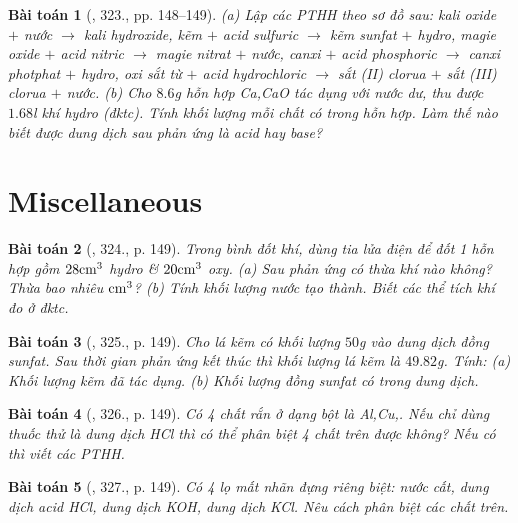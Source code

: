 \documentclass{article}
\newtheorem{baitoan}{Bài toán}
\begin{document}
\begin{baitoan}[\cite{An_400_BT_Hoa_Hoc_8_2020}, 323., pp. 148--149]
	(a) Lập các PTHH theo sơ đồ sau: kali oxide $+$ nước $\to$ kali hydroxide, kẽm $+$ acid sulfuric $\to$ kẽm sunfat $+$ hydro, magie oxide $+$ acid nitric $\to$ magie nitrat $+$ nước, canxi $+$ acid phosphoric $\to$ canxi photphat $+$ hydro, oxi sắt từ \emph{} $+$ acid hydrochloric $\to$ sắt (II) clorua $+$ sắt (III) clorua $+$ nước. (b) Cho $8.6$\emph{g} hỗn hợp \emph{Ca,CaO} tác dụng với nước dư, thu được $1.68$\emph{l} khí hydro (đktc). Tính khối lượng mỗi chất có trong hỗn hợp. Làm thế nào biết được dung dịch sau phản ứng là acid hay base?
\end{baitoan}


\section{Miscellaneous}

\begin{baitoan}[\cite{An_400_BT_Hoa_Hoc_8_2020}, 324., p. 149]
	Trong bình đốt khí, dùng tia lửa điện để đốt 1 hỗn hợp gồm $\rm28cm^3$ hydro \& $\rm20cm^3$ oxy. (a) Sau phản ứng có thừa khí nào không? Thừa bao nhiêu $\rm cm^3$? (b) Tính khối lượng nước tạo thành. Biết các thể tích khí đo ở đktc.
\end{baitoan}

\begin{baitoan}[\cite{An_400_BT_Hoa_Hoc_8_2020}, 325., p. 149]
	Cho lá kẽm có khối lượng $50$\emph{g} vào dung dịch đồng sunfat. Sau thời gian phản ứng kết thúc thì khối lượng lá kẽm là $49.82$\emph{g}. Tính: (a) Khối lượng kẽm đã tác dụng. (b) Khối lượng đồng sunfat có trong dung dịch.
\end{baitoan}

\begin{baitoan}[\cite{An_400_BT_Hoa_Hoc_8_2020}, 326., p. 149]
	Có 4 chất rắn ở dạng bột là \emph{Al,Cu,}. Nếu chỉ dùng thuốc thử là dung dịch \emph{HCl} thì có thể phân biệt 4 chất trên được không? Nếu có thì viết các PTHH.
\end{baitoan}

\begin{baitoan}[\cite{An_400_BT_Hoa_Hoc_8_2020}, 327., p. 149]
	Có 4 lọ mất nhãn đựng riêng biệt: nước cất, dung dịch acid \emph{HCl}, dung dịch \emph{KOH}, dung dịch \emph{KCl}. Nêu cách phân biệt các chất trên.
\end{baitoan}
\end{document}
